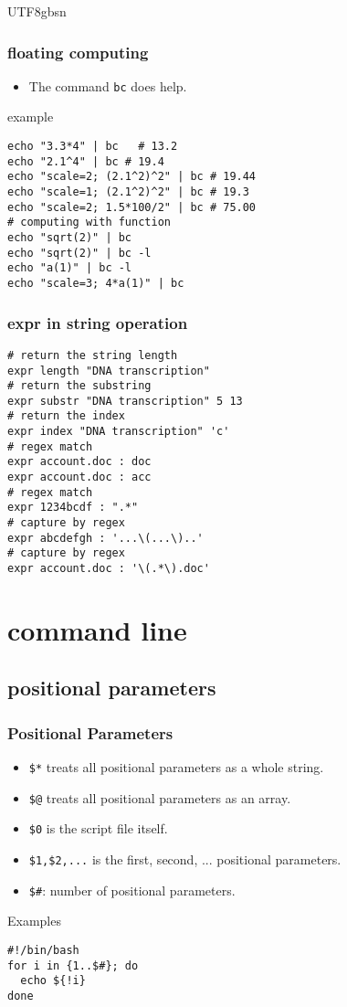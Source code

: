 \documentclass[red]{beamer}
\newcommand*{\lstverb}{\lstinline[style=caret]}
\begin{document}
\begin{CJK*}{UTF8}{gbsn}
\begin{frame}
\frametitle{floating computing}
\begin{itemize}
	\item The command \texttt{bc} does help.
\end{itemize}
\begin{block}{\centering example}
\begin{lstlisting}
echo "3.3*4" | bc	# 13.2
echo "2.1^4" | bc # 19.4
echo "scale=2; (2.1^2)^2" | bc # 19.44
echo "scale=1; (2.1^2)^2" | bc # 19.3
echo "scale=2; 1.5*100/2" | bc # 75.00
# computing with function
echo "sqrt(2)" | bc
echo "sqrt(2)" | bc -l
echo "a(1)" | bc -l
echo "scale=3; 4*a(1)" | bc
\end{lstlisting}
\end{block}
\end{frame}

\begin{frame}
\frametitle{expr in string operation}
\begin{block}{}
\begin{lstlisting}
# return the string length
expr length "DNA transcription"
# return the substring
expr substr "DNA transcription" 5 13
# return the index
expr index "DNA transcription" 'c'
# regex match
expr account.doc : doc
expr account.doc : acc
# regex match
expr 1234bcdf : ".*"
# capture by regex
expr abcdefgh : '...\(...\)..'
# capture by regex
expr account.doc : '\(.*\).doc'
\end{lstlisting}
\end{block}
\end{frame}

\section{command line}

\subsection{positional parameters}

\begin{frame}
\frametitle{Positional Parameters}
\begin{itemize}
	\item \lstverb|$*| treats all positional parameters as a whole string.
	\item \lstverb|$@| treats all positional parameters as an array.
	\item \lstverb|$0| is the script file itself.
	\item \lstverb|$1,$2,...| is the first, second, ... positional parameters.
	\item \lstverb|$#|: number of positional parameters.
\end{itemize}
\begin{block}{\centering Examples}
\begin{lstlisting}
#!/bin/bash
for i in {1..$#}; do
  echo ${!i}
done
\end{lstlisting}
\end{block}
\end{frame}


\end{CJK*}
\end{document}
